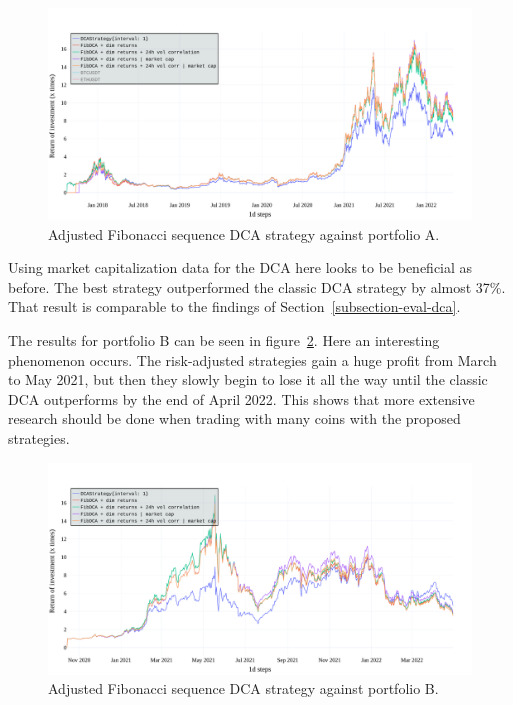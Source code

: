 \begin{figure}[!t]
    \centering
    \includegraphics[width=\columnwidth]{figures/fibseq-portfolio-A.pdf}
    \caption{Adjusted Fibonacci sequence DCA strategy against portfolio A.}
    \label{figure-fibseq-portfolio-A}
\end{figure}

Using market capitalization data for the DCA here looks to be beneficial as before. The best strategy outperformed the classic DCA strategy by almost 37\%. That result is comparable to the findings of Section~\ref{subsection-eval-dca}.

The results for portfolio B can be seen in figure~\ref{figure-fibseq-portfolio-B}. Here an interesting phenomenon occurs. The risk-adjusted strategies gain a huge profit from March to May 2021, but then they slowly begin to lose it all the way until the classic DCA outperforms by the end of April 2022. This shows that more extensive research should be done when trading with many coins with the proposed strategies.

\begin{figure}[!t]
    \centering
    \includegraphics[width=\columnwidth]{figures/fibseq-portfolio-B.pdf}
    \caption{Adjusted Fibonacci sequence DCA strategy against portfolio B.}
    \label{figure-fibseq-portfolio-B}
\end{figure}

